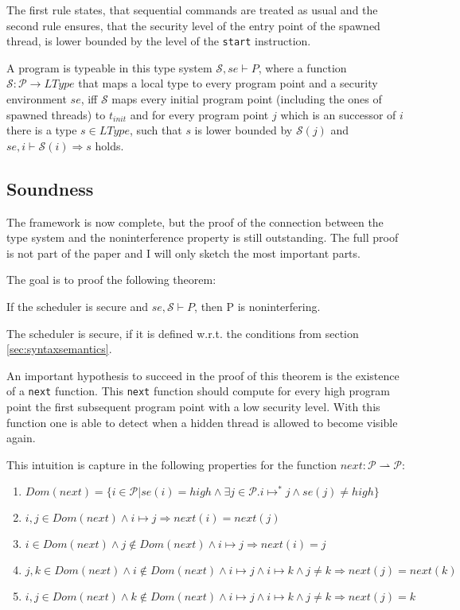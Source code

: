 \documentclass[a4paper,10pt]{llncs}
\begin{document}
The first rule states, that sequential commands are treated as usual
and the second rule ensures, that the security level of the entry point
of the spawned thread, is lower bounded by the level of the \texttt{start}
instruction.

A program is typeable in this type system $\mathcal{S}, se \vdash P$, where a function $\mathcal{S}:
\mathcal{P} \rightarrow LType$ that maps a local type to every program point
and a security environment $se$, iff $\mathcal{S}$ maps every initial program point
(including the ones of spawned threads) to $t_{init}$ and for every program point $j$ which is an
successor of $i$ there is a type $s \in LType$, such that $s$ is lower bounded
by $\mathcal{S}(j)$ and $se, i \vdash \mathcal{S}(i) \Rightarrow s$ holds.


\subsection{Soundness}
\label{sec:soundness}
The framework is now complete, but the proof of the connection between the
type system and the noninterference property is still outstanding. The full
proof is not part of the paper and I will only sketch the most important
parts.

The goal is to proof the following theorem:

\begin{theorem}
If the scheduler is secure and $se, \mathcal{S} \vdash P$, then P is noninterfering.
\end{theorem}

The scheduler is secure, if it is defined w.r.t. the conditions from section \ref{sec:syntaxsemantics}.

An important hypothesis to succeed in the proof of this theorem is the existence
of a \texttt{next} function. This \texttt{next} function should compute for every
high program point the first subsequent program point with a low security level. With
this function one is able to detect when a hidden thread is allowed to become visible
again.

This intuition is capture in the following properties for the function $next: \mathcal{P}
\rightharpoonup \mathcal{P}$:

\begin{enumerate}
\item $Dom(next) = \{i \in \mathcal{P} | se(i) = high \land \exists j \in \mathcal{P} . i \mapsto^* j \land se(j) \neq high\}$ 
\item $i, j \in Dom(next) \land i \mapsto j \Rightarrow next(i) = next(j)$
\item $i \in Dom(next) \land j \not\in Dom(next) \land i \mapsto j \Rightarrow next(i) = j$
\item $j, k \in Dom(next) \land i \not\in Dom(next) \land i \mapsto j \land i \mapsto k \land j \neq k \Rightarrow next(j) = next(k)$ 
\item $i, j \in Dom(next) \land k \not\in Dom(next) \land i \mapsto j \land i \mapsto k \land j \neq k \Rightarrow next(j) = k$
\end{enumerate}
\end{document}
